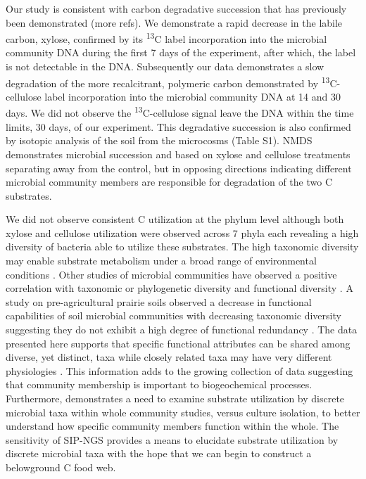 Our study is consistent with carbon degradative succession that has previously been demonstrated \cite{Bastian_2009} (more refs). We demonstrate a rapid decrease in the labile carbon, xylose, confirmed by its \textsuperscript{13}C label incorporation into the microbial community DNA during the first 7 days of the experiment, after which, the label is not detectable in the DNA. Subsequently our data demonstrates a slow degradation of the more recalcitrant, polymeric carbon demonstrated by \textsuperscript{13}C-cellulose label incorporation into the microbial community DNA at 14 and 30 days. We did not observe the \textsuperscript{13}C-cellulose signal leave the DNA within the time limits, 30 days, of our experiment. This degradative succession is also confirmed by isotopic analysis of the soil from the microcosms (Table S1). NMDS demonstrates microbial succession and based on xylose and cellulose treatments separating away from the control, but in opposing directions indicating different microbial community members are responsible for degradation of the two C substrates. 

We did not observe consistent C utilization at the phylum level although both xylose and cellulose utilization were observed across 7 phyla each revealing a high diversity of bacteria able to utilize these substrates. The high taxonomic diversity may enable substrate metabolism under a broad range of environmental conditions \cite{Goldfarb_2011}. Other studies of microbial communities have observed a positive correlation with taxonomic or phylogenetic diversity and functional diversity \cite{Fierer_2012,Fierer_2013,Philippot_2010,Tringe_2005,Gilbert_2010,Bryant_2012}. A study on pre-agricultural prairie soils observed a decrease in functional capabilities of soil microbial communities with decreasing taxonomic diversity suggesting they do not exhibit a high degree of functional redundancy \cite{Fierer_2013}. The data presented here supports that specific functional attributes can be shared among diverse, yet distinct, taxa while closely related taxa may have very different physiologies \cite{Fierer_2012,Philippot_2010}. This information adds to the growing collection of data suggesting that community membership is important to biogeochemical processes. Furthermore, demonstrates a need to examine substrate utilization by discrete microbial taxa within whole community studies, versus culture isolation, to better understand how specific community members function within the whole. The sensitivity of SIP-NGS provides a means to elucidate substrate utilization by discrete microbial taxa with the hope that we can begin to construct a belowground C food web.          
 
